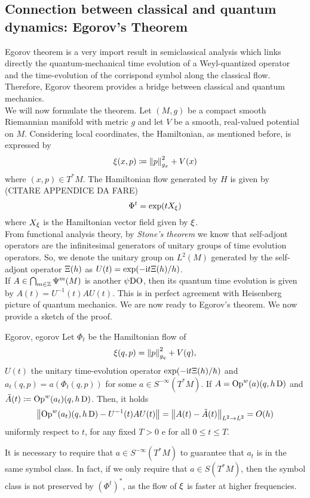 \subsection{Connection between classical and quantum dynamics: Egorov's Theorem}


Egorov theorem is a very import result in semiclassical analysis which links directly the quantum-mechanical time evolution of a Weyl-quantized operator and the time-evolution of the corrispond symbol along the classical flow. Therefore, Egorov theorem provides a bridge between classical and quantum mechanics.\\
We will now formulate the theorem. Let $(M,g)$ be a compact smooth Riemannian manifold with metric $g$ and let $V$ be a smooth, real-valued potential on $M$. Considering local coordinates, the Hamiltonian, as mentioned before, is expressed by 
\[
\operatorname{\xi}(x,p)\coloneqq\left\lVert p\right\rVert_{g_{x}}^{2}+V(x)
\]
where $(x,p)\in T^{\ast}M$. The Hamiltonian flow generated by $H$ is given by (CITARE APPENDICE DA FARE)
\[
\Phi^{t}=\exp(t X_{\operatorname{\xi}})
\]
where $X_{\operatorname{\xi}}$ is the Hamiltonian vector field given by $\operatorname{\xi}$.\\
From functional analysis theory, by \emph{Stone's theorem} we know that self-adjont operators are the infinitesimal generators of unitary groups of time evolution operators. So, we denote the unitary group on $L^{2}(M)$ generated by the self-adjont operator $\Xi(h)$ as $U(t)=\exp(-\mathrm{i} t \Xi(h)/h)$.\\
If $A\in\bigcap_{m\in\mathbb{Z}}\Psi^{m}(M)$ is another $\operatorname{\psi DO}$, then its quantum time evolution is given by $A(t)=U^{-1}(t)AU(t)$. This is in perfect agreement with Heisenberg picture of quantum mechanics. We are now ready to Egorov's theorem. We now provide a sketch of the proof.


\begin{impTeo}{Egorov, \cite{Egorov:article}}{egorov}
Let $\Phi_{t}$ be the Hamiltonian flow of 
\[
\operatorname{\xi}(q,p)=\left\lVert p\right\rVert^{2}_{g_{q}}+V(q),
\]
$U(t)$ the unitary time-evolution operator $\exp(-\mathrm{i} t \Xi(h)/h)$ and $a_{t}(q,p)=a(\Phi_{t}(q,p))$ for some $a\in S^{-\infty}(T^{\ast} M)$. If $A=\operatorname{Op}^{w}(a)(q,h \operatorname{D})$ and $\tilde{A}(t)\coloneqq\operatorname{Op}^{w}(a_{t})(q,h\operatorname{D})$. Then, it holds
\[
\left\lVert \operatorname{Op}^{w}(a_{t})(q,h\operatorname{D})-U^{-1}(t)AU(t)\right\rVert=\left\lVert A(t)-\tilde{A}(t)\right\rVert_{L^{2}\to L^{2}}=O(h)
\]
uniformly respect to $t$, for any fixed $T>0$ e for all $0\leq t\leq T$.
\end{impTeo}
\begin{remark}
It is necessary to require that $a\in S^{-\infty}(T^{\ast}M)$ to guarantee that $a_{t}$ is in the same symbol class. In fact, if we only require that $a\in S(T^{\ast}M)$, then the symbol class is not preserved by $(\Phi^{t})^{\ast}$, as the flow of $\operatorname{\xi}$ is faster at higher frequencies.
\end{remark}

